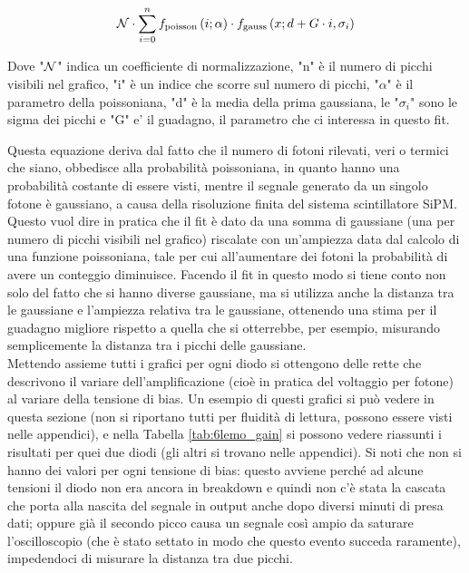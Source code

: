 \begin{equation}
	{\cal N}\cdot\sum_{i=0}^{n}f_{\mathrm{poisson}}\left(i;\alpha\right)\cdot f_{\mathrm{gauss}}\left(x; d + G\cdot i, \sigma_i\right)
	\label{eq:segnale_buio}
\end{equation}

Dove "${\cal N}$" indica un coefficiente di normalizzazione, "n" \`e il numero di picchi visibili nel grafico, "i" \`e un indice che scorre sul numero di picchi, "$\alpha$" \`e il parametro della poissoniana, "d" \`e la media della prima gaussiana, le "$\sigma_i$" sono le sigma dei picchi e "G" e' il guadagno, il parametro che ci interessa in questo fit.

Questa equazione deriva dal fatto che il numero di fotoni rilevati, veri o termici che siano, obbedisce alla probabilit\`a poissoniana, in quanto hanno una probabilit\`a costante di essere visti, mentre il segnale generato da un singolo fotone \`e gaussiano, a causa della risoluzione finita del sistema scintillatore SiPM. Questo vuol dire in pratica che il fit è dato da una somma di gaussiane (una per numero di picchi visibili nel grafico) riscalate con un'ampiezza data dal calcolo di una funzione poissoniana, tale per cui all'aumentare dei fotoni la probabilità di avere un conteggio
diminuisce. Facendo il fit in questo modo si tiene conto non solo del fatto che si hanno diverse gaussiane, ma si utilizza anche la distanza tra le gaussiane e  l'ampiezza
relativa tra le gaussiane, ottenendo una stima per il guadagno migliore rispetto a quella che si otterrebbe, per esempio, misurando semplicemente la distanza tra i picchi delle gaussiane.\\

Mettendo assieme tutti i grafici per ogni diodo si ottengono delle rette che descrivono il variare dell'amplificazione (cioè in pratica del voltaggio per fotone) al variare
della tensione di bias. Un esempio di questi grafici si può vedere in questa sezione (non si riportano tutti per fluidità di lettura, possono essere visti nelle appendici), e nella Tabella \ref{tab:6lemo_gain} si possono vedere riassunti i risultati per quei due diodi (gli altri si trovano nelle appendici). Si noti che non si hanno dei valori per ogni tensione
di bias: questo avviene perché ad alcune tensioni il diodo non era ancora in breakdown e quindi non c'è stata la cascata che porta alla nascita del segnale in output anche dopo diversi minuti di presa dati; oppure gi\`a il secondo picco causa un segnale così ampio da saturare l'oscilloscopio (che è stato settato in modo che questo evento succeda raramente), impedendoci di misurare la distanza tra due picchi.

